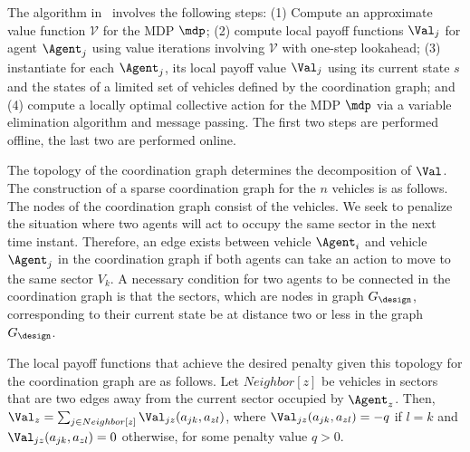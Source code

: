 The algorithm in~\cite{guestrin2002multiagent} involves the following steps: (1) Compute an approximate value function $\mathcal V$ for the MDP $\mdp$; (2) compute local payoff functions $\Val_j$ for agent $\Agent_j$ using value iterations involving $\mathcal V$ with one-step lookahead; (3) instantiate for each $\Agent_j$, its local payoff value $\Val_j$ using its current state $s$ and the states of a limited set of vehicles defined by the coordination graph; and (4) compute a locally optimal collective action for the MDP $\mdp$ via a variable elimination algorithm and message passing. %
The first two steps are performed offline, the last two are performed online. %

The topology of the coordination graph determines the decomposition of $\Val$. %
The construction of a sparse coordination graph for the $n$ vehicles is as follows. %
The nodes of the coordination graph consist of the vehicles. %
We seek to penalize the situation where two agents will act to occupy the same sector in the next time instant. 
Therefore, an edge exists between vehicle $\Agent_i$ and vehicle $\Agent_j$ in the coordination graph if both agents can take an action to move to the same sector $V_k$. %
A necessary condition for two agents to be connected in the coordination graph is that the sectors, which are nodes in graph $G_\design$, corresponding to their current state be at distance two or less in the graph $G_\design$. 

The local payoff functions that achieve the desired penalty given this topology for the coordination graph are as follows. %
Let $Neighbor[z]$ be vehicles in sectors that are two edges away from the current sector occupied by $\Agent_z$. %
Then, $\Val_z = \sum_{j \in Neighbor[z]} \Val_{jz}(a_{jk},a_{zl})$, where $\Val_{jz}(a_{jk},a_{zl}) = -q$ if $l= k$ and $\Val_{jz}(a_{jk},a_{zl}) = 0$ otherwise, for some penalty value $q >0$. %

